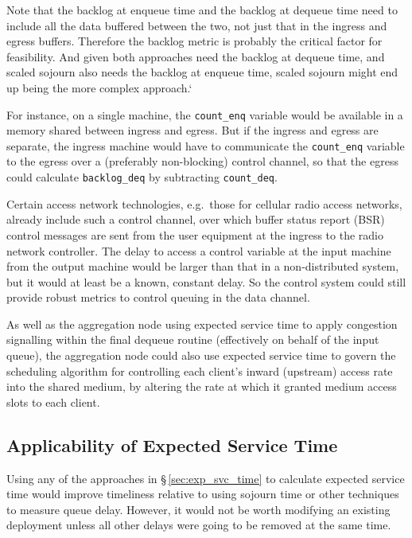 Note that the backlog at enqueue time and the backlog at dequeue time need to include all the data buffered between the two, not just that in the ingress and egress buffers. Therefore the backlog metric is probably the critical factor for feasibility. And given both approaches need the backlog at dequeue time, and scaled sojourn also needs the backlog at enqueue time, scaled sojourn might end up being the more complex approach.`

For instance, on a single machine, the \texttt{count\_enq} variable would be available in a memory shared between ingress and egress. But if the ingress and egress are separate, the ingress machine would have to communicate the \texttt{count\_enq} variable to the egress over a (preferably non-blocking) control channel, so that the egress could calculate \texttt{backlog\_deq} by subtracting \texttt{count\_deq}. 

Certain access network technologies, e.g.\ those for cellular radio access networks, already include such a control channel, over which buffer status report (BSR) control messages are sent from the user equipment at the ingress to the radio network controller. The delay to access a control variable at the input machine from the output machine would be larger than that in a non-distributed system, but it would at least be a known, constant delay. So the control system could still provide robust metrics to control queuing in the data channel.

As well as the aggregation node using expected service time to apply congestion signalling within the final dequeue routine (effectively on behalf of the input queue), the aggregation node could also use expected service time to govern the scheduling algorithm for controlling each client's inward (upstream) access rate into the shared medium, by altering the rate at which it granted medium access slots to each client.

\subsection{Applicability of Expected Service Time}\label{sec:inst_svc_time_applic}

Using any of the approaches in \S\,\ref{sec:exp_svc_time} to calculate expected service time would improve timeliness relative to using sojourn time or other techniques to measure queue delay. However, it would not be worth modifying an existing deployment unless all other delays were going to be removed at the same time. 

